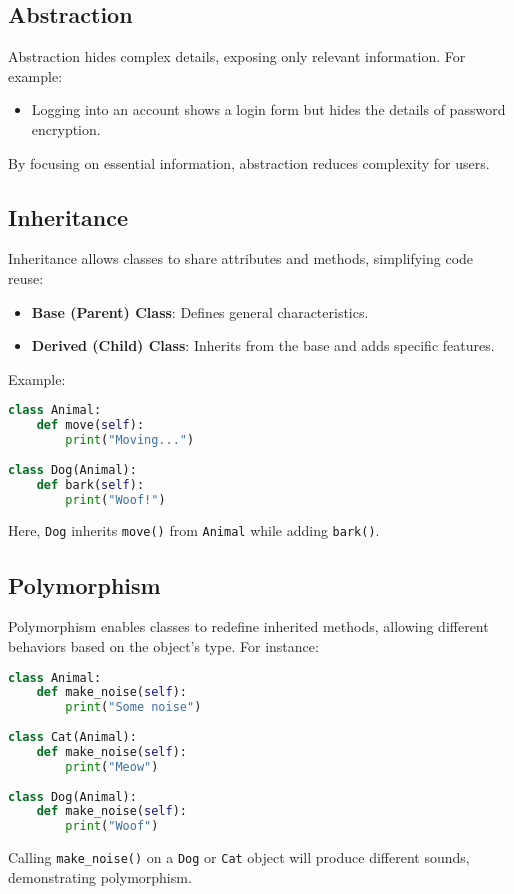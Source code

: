 \documentclass{article}
\begin{document}
\subsection{Abstraction}
Abstraction hides complex details, exposing only relevant information. For example:
\begin{itemize}
    \item Logging into an account shows a login form but hides the details of password encryption.
\end{itemize}
By focusing on essential information, abstraction reduces complexity for users.

\subsection{Inheritance}
Inheritance allows classes to share attributes and methods, simplifying code reuse:
\begin{itemize}
    \item \textbf{Base (Parent) Class}: Defines general characteristics.
    \item \textbf{Derived (Child) Class}: Inherits from the base and adds specific features.
\end{itemize}

Example:
\begin{lstlisting}[language=Python]
class Animal:
    def move(self):
        print("Moving...")
        
class Dog(Animal):
    def bark(self):
        print("Woof!")
\end{lstlisting}
Here, \texttt{Dog} inherits \texttt{move()} from \texttt{Animal} while adding \texttt{bark()}.

\subsection{Polymorphism}
Polymorphism enables classes to redefine inherited methods, allowing different behaviors based on the object’s type. For instance:
\begin{lstlisting}[language=Python]
class Animal:
    def make_noise(self):
        print("Some noise")
        
class Cat(Animal):
    def make_noise(self):
        print("Meow")
        
class Dog(Animal):
    def make_noise(self):
        print("Woof")
\end{lstlisting}

Calling \texttt{make\_noise()} on a \texttt{Dog} or \texttt{Cat} object will produce different sounds, demonstrating polymorphism.
\end{document}

